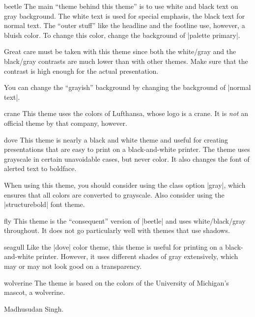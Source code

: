 \begin{colorthemeexample}{beetle}
  The main ``theme behind this theme'' is to use white and black text on gray background. The white text is used for special emphasis, the black text for normal text. The ``outer stuff'' like the headline and the footline use, however, a bluish color. To change this color, change the background of |palette primary|.

  Great care must be taken with this theme since both the white/gray and the black/gray contrasts are much lower than with other themes. Make sure that the contrast is high enough for the actual presentation.

  You can change the ``grayish'' background by changing the background of |normal text|.
\end{colorthemeexample}

\begin{colorthemeexample}{crane}
  This theme uses the colors of Lufthansa, whose logo is a crane. It is \emph{not} an official theme by that company, however.
\end{colorthemeexample}

\begin{colorthemeexample}{dove}
  This theme is nearly a black and white theme and useful for creating presentations that are easy to print on a black-and-white printer. The theme uses grayscale in certain unavoidable cases, but never color. It also changes the font of alerted text to boldface.

  When using this theme, you should consider using the class option |gray|, which ensures that all colors are converted to grayscale. Also consider using the |structurebold| font theme.
\end{colorthemeexample}

\begin{colorthemeexample}{fly}
  This theme is the ``consequent'' version of |beetle| and uses white/black/gray throughout. It does not go particularly well with themes that use shadows.
\end{colorthemeexample}

\begin{colorthemeexample}{seagull}
  Like the |dove| color theme, this theme is useful for printing on a black-and-white printer. However, it uses different shades of gray extensively, which may or may not look good on a transparency.
\end{colorthemeexample}

\begin{colorthemeexample}{wolverine}
  The theme is based on the colors of the University of Michigan's mascot, a wolverine.

  \themeauthor Madhusudan Singh.
\end{colorthemeexample}

